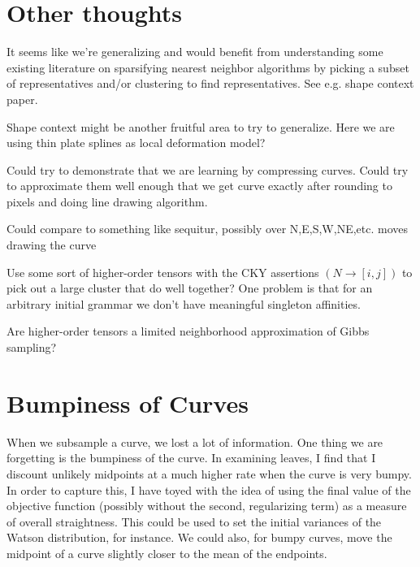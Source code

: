\documentclass{article}
\begin{document}
\section{Other thoughts}
\bitem

\item It seems like we're generalizing and would benefit from
  understanding some existing literature on sparsifying nearest
  neighbor algorithms by picking a subset of representatives and/or
  clustering to find representatives. See e.g. shape context paper.

\item Shape context might be another fruitful area to try to generalize.
  Here we are using thin plate splines as local deformation model?

\item Could try to demonstrate that we are learning by compressing
  curves. Could try to approximate them well enough that we get curve
  exactly after rounding to pixels and doing line drawing algorithm.

  Could compare to something like sequitur, possibly over
  N,E,S,W,NE,etc. moves drawing the curve

\item Use some sort of higher-order tensors with the CKY assertions
  $(N \to [i,j])$ to pick out a large cluster that do well together?
  One problem is that for an arbitrary initial grammar we don't have
  meaningful singleton affinities.

\item Are higher-order tensors a limited neighborhood approximation of
  Gibbs sampling?

\eitem


\section{Bumpiness of Curves}
When we subsample a curve, we lost a lot of information. One thing we
are forgetting is the bumpiness of the curve. In examining leaves, I
find that I discount unlikely midpoints at a much higher rate when the
curve is very bumpy. In order to capture this, I have toyed with the
idea of using the final value of the objective function (possibly
without the second, regularizing term) as a measure of overall
straightness. This could be used to set the initial variances of the
Watson distribution, for instance. We could also, for bumpy curves,
move the midpoint of a curve slightly closer to the mean of the
endpoints.
\end{document}
